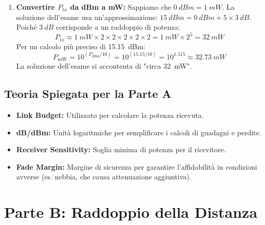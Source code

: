 \begin{enumerate}[label=\textbf{Step \arabic*:}, wide, labelwidth=!, labelindent=0pt]
    \item \textbf{Convertire $P_{tx}$ da dBm a mW:}
    Sappiamo che $\SI{0}{dBm} = \SI{1}{mW}$.
    La soluzione dell'esame usa un'approssimazione: $\SI{15}{dBm} = \SI{0}{dBm} + 5 \times \SI{3}{dB}$.
    Poiché $\SI{+3}{dB}$ corrisponde a un raddoppio di potenza:
    \begin{equation}
        P_{tx} \approx \SI{1}{mW} \times 2 \times 2 \times 2 \times 2 \times 2 = \SI{1}{mW} \times 2^5 = \SI{32}{mW}
    \end{equation}
    Per un calcolo più preciso di \SI{15.15}{dBm}:
    \begin{equation}
        P_{\text{mW}} = 10^{(P_{\text{dBm}} / 10)} = 10^{(15.15 / 10)} = 10^{1.515} \approx \SI{32.73}{mW}
    \end{equation}
    La soluzione dell'esame si accontenta di "circa \SI{32}{mW}".
\end{enumerate}

\subsection*{Teoria Spiegata per la Parte A}
\begin{itemize}
    \item \textbf{Link Budget:} Utilizzato per calcolare la potenza ricevuta.
    \item \textbf{dB/dBm:} Unità logaritmiche per semplificare i calcoli di guadagni e perdite.
    \item \textbf{Receiver Sensitivity:} Soglia minima di potenza per il ricevitore.
    \item \textbf{Fade Margin:} Margine di sicurezza per garantire l'affidabilità in condizioni avverse (es. nebbia, che causa attenuazione aggiuntiva).
\end{itemize}

\section{Parte B: Raddoppio della Distanza}

